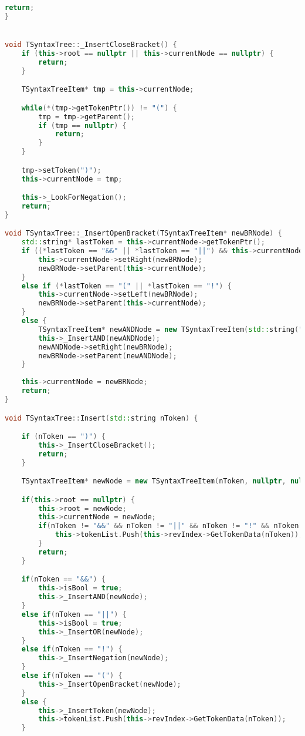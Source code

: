 \begin{lstlisting}[language=C++]
    return;
}


void TSyntaxTree::_InsertCloseBracket() {
    if (this->root == nullptr || this->currentNode == nullptr) {
        return;
    }

    TSyntaxTreeItem* tmp = this->currentNode;

    while(*(tmp->getTokenPtr()) != "(") {
        tmp = tmp->getParent();
        if (tmp == nullptr) {
            return;
        }
    }

    tmp->setToken(")");
    this->currentNode = tmp;

    this->_LookForNegation();
    return;
}

void TSyntaxTree::_InsertOpenBracket(TSyntaxTreeItem* newBRNode) {
    std::string* lastToken = this->currentNode->getTokenPtr();
    if ((*lastToken == "&&" || *lastToken == "||") && this->currentNode->getRight() == nullptr) {
        this->currentNode->setRight(newBRNode);
        newBRNode->setParent(this->currentNode);
    } 
    else if (*lastToken == "(" || *lastToken == "!") {
        this->currentNode->setLeft(newBRNode);
        newBRNode->setParent(this->currentNode);
    }
    else {
        TSyntaxTreeItem* newANDNode = new TSyntaxTreeItem(std::string("&&"));
        this->_InsertAND(newANDNode);
        newANDNode->setRight(newBRNode);
        newBRNode->setParent(newANDNode);
    }
    
    this->currentNode = newBRNode;
    return;
}

void TSyntaxTree::Insert(std::string nToken) {

    if (nToken == ")") {
        this->_InsertCloseBracket();
        return;
    }

    TSyntaxTreeItem* newNode = new TSyntaxTreeItem(nToken, nullptr, nullptr, nullptr);

    if(this->root == nullptr) {
        this->root = newNode;
        this->currentNode = newNode;
        if(nToken != "&&" && nToken != "||" && nToken != "!" && nToken != "(") {
            this->tokenList.Push(this->revIndex->GetTokenData(nToken));
        }
        return;
    }

    if(nToken == "&&") {
        this->isBool = true;
        this->_InsertAND(newNode);
    }
    else if(nToken == "||") {
        this->isBool = true;
        this->_InsertOR(newNode);
    }
    else if(nToken == "!") {
        this->_InsertNegation(newNode);
    }
    else if(nToken == "(") {
        this->_InsertOpenBracket(newNode);
    }
    else {
        this->_InsertToken(newNode);
        this->tokenList.Push(this->revIndex->GetTokenData(nToken));
    }


\end{lstlisting}
